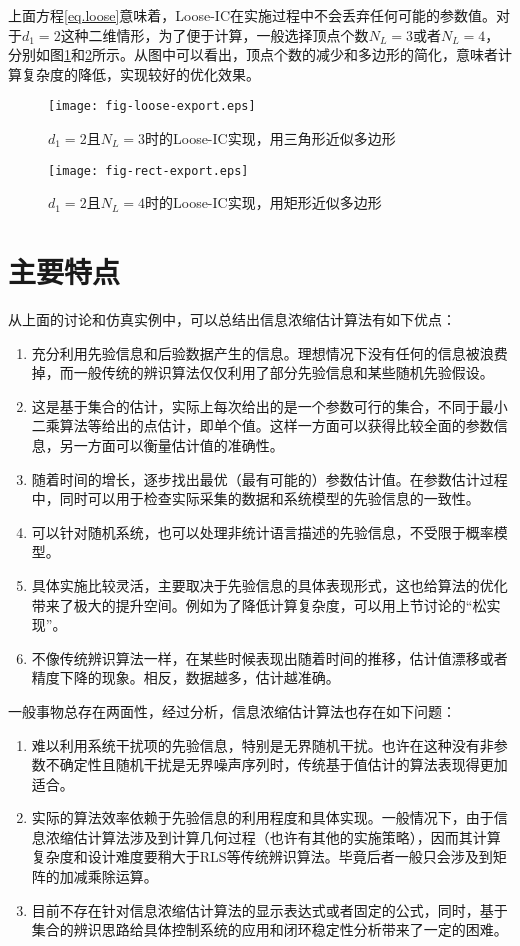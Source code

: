 上面方程\eqref{eq.loose}意味着，Loose-IC在实施过程中不会丢弃任何可能的参数值。对于$d_{1}=2$这种二维情形，为了便于计算，一般选择顶点个数$N_{L}=3$或者$N_{L}=4$，分别如图\ref{fig.3.loose.3}和\ref{fig.3.loose.4}所示。从图中可以看出，顶点个数的减少和多边形的简化，意味者计算复杂度的降低，实现较好的优化效果。
\begin{figure}[h]
 \centering
 \texttt{[image: fig-loose-export.eps]}\\	 %
 \caption{$d_{1}=2$且$N_{L}=3$时的Loose-IC实现，用三角形近似多边形}
 \label{fig.3.loose.3}
\end{figure}
\begin{figure}[h]
 \centering
 \texttt{[image: fig-rect-export.eps]}\\	 %
 \caption{$d_{1}=2$且$N_{L}=4$时的Loose-IC实现，用矩形近似多边形}
 \label{fig.3.loose.4}
\end{figure}

\section{主要特点}\label{sect:3.6}
从上面的讨论和仿真实例中，可以总结出信息浓缩估计算法有如下优点：
\begin{enumerate}
\item 充分利用先验信息和后验数据产生的信息。理想情况下没有任何的信息被浪费掉，而一般传统的辨识算法仅仅利用了部分先验信息和某些随机先验假设。
\item 这是基于集合的估计，实际上每次给出的是一个参数可行的集合，不同于最小二乘算法等给出的点估计，即单个值。这样一方面可以获得比较全面的参数信息，另一方面可以衡量估计值的准确性。
\item 随着时间的增长，逐步找出最优（最有可能的）参数估计值。在参数估计过程中，同时可以用于检查实际采集的数据和系统模型的先验信息的一致性。
\item 可以针对随机系统，也可以处理非统计语言描述的先验信息，不受限于概率模型。
\item 具体实施比较灵活，主要取决于先验信息的具体表现形式，这也给算法的优化带来了极大的提升空间。例如为了降低计算复杂度，可以用上节讨论的“松实现”。
\item 不像传统辨识算法一样，在某些时候表现出随着时间的推移，估计值漂移或者精度下降的现象。相反，数据越多，估计越准确。
\end{enumerate}

一般事物总存在两面性，经过分析，信息浓缩估计算法也存在如下问题：
\begin{enumerate}
\item 难以利用系统干扰项的先验信息，特别是无界随机干扰。也许在这种没有非参数不确定性且随机干扰是无界噪声序列时，传统基于值估计的算法表现得更加适合。
\item 实际的算法效率依赖于先验信息的利用程度和具体实现。一般情况下，由于信息浓缩估计算法涉及到计算几何过程（也许有其他的实施策略），因而其计算复杂度和设计难度要稍大于RLS等传统辨识算法。毕竟后者一般只会涉及到矩阵的加减乘除运算。
\item 目前不存在针对信息浓缩估计算法的显示表达式或者固定的公式，同时，基于集合的辨识思路给具体控制系统的应用和闭环稳定性分析带来了一定的困难。
\end{enumerate}

